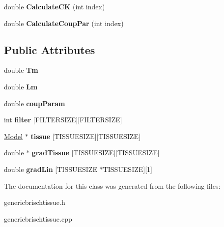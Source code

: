 \begin{DoxyCompactItemize}
\item 
double {\bfseries Calculate\+CK} (int index)\hypertarget{classGenericBRIschTissue_af37c3463407e6de87d146365f5d49435}{}\label{classGenericBRIschTissue_af37c3463407e6de87d146365f5d49435}

\item 
double {\bfseries Calculate\+Coup\+Par} (int index)\hypertarget{classGenericBRIschTissue_a71db064cad192ddd11f8d60f17d8979c}{}\label{classGenericBRIschTissue_a71db064cad192ddd11f8d60f17d8979c}

\end{DoxyCompactItemize}
\subsection*{Public Attributes}
\begin{DoxyCompactItemize}
\item 
double {\bfseries Tm}\hypertarget{classGenericBRIschTissue_aac8f611536bde8bd17a06555eeb0ec2d}{}\label{classGenericBRIschTissue_aac8f611536bde8bd17a06555eeb0ec2d}

\item 
double {\bfseries Lm}\hypertarget{classGenericBRIschTissue_a359eda8c6e38881a7ffb0b42a0558f85}{}\label{classGenericBRIschTissue_a359eda8c6e38881a7ffb0b42a0558f85}

\item 
double {\bfseries coup\+Param}\hypertarget{classGenericBRIschTissue_aa822abc12039f2223e652debe0dba268}{}\label{classGenericBRIschTissue_aa822abc12039f2223e652debe0dba268}

\item 
int {\bfseries filter} \mbox{[}F\+I\+L\+T\+E\+R\+S\+I\+ZE\mbox{]}\mbox{[}F\+I\+L\+T\+E\+R\+S\+I\+ZE\mbox{]}\hypertarget{classGenericBRIschTissue_a5adec89324d0afdc2d16868006863c50}{}\label{classGenericBRIschTissue_a5adec89324d0afdc2d16868006863c50}

\item 
\hyperlink{classModel}{Model} $\ast$ {\bfseries tissue} \mbox{[}T\+I\+S\+S\+U\+E\+S\+I\+ZE\mbox{]}\mbox{[}T\+I\+S\+S\+U\+E\+S\+I\+ZE\mbox{]}\hypertarget{classGenericBRIschTissue_a4268c0751c4f8659d7797c4865c559da}{}\label{classGenericBRIschTissue_a4268c0751c4f8659d7797c4865c559da}

\item 
double $\ast$ {\bfseries grad\+Tissue} \mbox{[}T\+I\+S\+S\+U\+E\+S\+I\+ZE\mbox{]}\mbox{[}T\+I\+S\+S\+U\+E\+S\+I\+ZE\mbox{]}\hypertarget{classGenericBRIschTissue_abd673311ba76abf65ea0375394e48040}{}\label{classGenericBRIschTissue_abd673311ba76abf65ea0375394e48040}

\item 
double {\bfseries grad\+Lin} \mbox{[}T\+I\+S\+S\+U\+E\+S\+I\+ZE $\ast$T\+I\+S\+S\+U\+E\+S\+I\+ZE\mbox{]}\mbox{[}1\mbox{]}\hypertarget{classGenericBRIschTissue_a02174af1a81a8fd6f5c78ba3094bfda3}{}\label{classGenericBRIschTissue_a02174af1a81a8fd6f5c78ba3094bfda3}

\end{DoxyCompactItemize}


The documentation for this class was generated from the following files\+:\begin{DoxyCompactItemize}
\item 
genericbrischtissue.\+h\item 
genericbrischtissue.\+cpp\end{DoxyCompactItemize}
